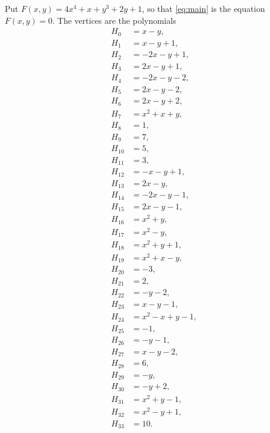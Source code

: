 \documentclass[11pt]{article}
\begin{document}
Put $F(x,y)=4x^{4}+x+y^{3}+2y+1$, so that \eqref{eq:main} is the equation $F(x,y)=0$. The vertices are the polynomials
\begin{align*}
H_{0}&=x-y,\\
H_{1}&=x-y+1,\\
H_{2}&=-2x-y+1,\\
H_{3}&=2x-y+1,\\
H_{4}&=-2x-y-2,\\
H_{5}&=2x-y-2,\\
H_{6}&=2x-y+2,\\
H_{7}&=x^{2}+x+y,\\
H_{8}&=1,\\
H_{9}&=7,\\
H_{10}&=5,\\
H_{11}&=3,\\
H_{12}&=-x-y+1,\\
H_{13}&=2x-y,\\
H_{14}&=-2x-y-1,\\
H_{15}&=2x-y-1,\\
H_{16}&=x^{2}+y,\\
H_{17}&=x^{2}-y,\\
H_{18}&=x^{2}+y+1,\\
H_{19}&=x^{2}+x-y,\\
H_{20}&=-3,\\
H_{21}&=2,\\
H_{22}&=-y-2,\\
H_{23}&=x-y-1,\\
H_{24}&=x^{2}-x+y-1,\\
H_{25}&=-1,\\
H_{26}&=-y-1,\\
H_{27}&=x-y-2,\\
H_{28}&=6,\\
H_{29}&=-y,\\
H_{30}&=-y+2,\\
H_{31}&=x^{2}+y-1,\\
H_{32}&=x^{2}-y+1,\\
H_{33}&=10.
\end{align*}
\end{document}
